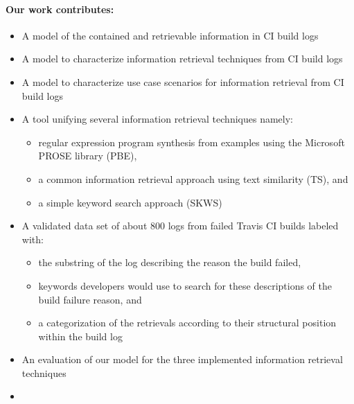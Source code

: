 \documentclass[\myrootdir/main.tex]{subfiles}
\begin{document}
\paragraph{Our work contributes:}
\begin{itemize}
  \item A model of the contained and retrievable information in CI build logs
  \item A model to characterize information retrieval techniques from CI build logs
  \item A model to characterize use case scenarios for information retrieval from CI build logs
  \item A tool unifying several information retrieval techniques namely:
        \begin{itemize}
          \item regular expression program synthesis from examples using the Microsoft PROSE library (PBE),
          \item a common information retrieval approach using text similarity (TS), and
          \item a simple keyword search approach (SKWS)
        \end{itemize}
  \item A validated data set of about 800 logs from failed Travis CI builds labeled with:
        \begin{itemize}
          \item the substring of the log describing the reason the build failed,
          \item keywords developers would use to search for these descriptions of the build failure reason, and
          \item a categorization of the retrievals according to their structural position within the build log
        \end{itemize}
  \item An evaluation of our model for the three implemented information retrieval techniques 
  \item {}
\end{itemize}
\end{document}
